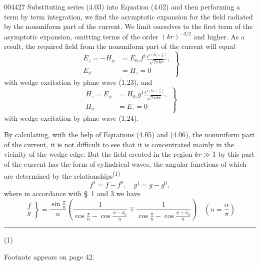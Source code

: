 \begin{scanpage}{0044}{27}
Substituting series (4.03) into Equation (4.02) and then performing a term by term integration, we find the asymptotic expansion for the field radiated by the nonuniform part of the current. We limit ourselves to the first term of the asymptotic expansion, omitting terms of the order $(kr)^{-3/2}$ and higher. As a result, the required field from the nonuniform part of the current will equal
\[\left.\begin{aligned}E_z=-H_\phi&=E_{0z}f^1\frac{e^{i(kr+\frac\pi4)}}{\sqrt{2\pi kr}},\\E_\phi&=H_z=0\end{aligned}\right\}\tag{4.05}\]
with wedge excitation by plane wave (1.23), and
\[\left.\begin{aligned}H_z=E_\phi&=H_{0z}g^1\frac{e^{i(kr+\frac\pi4)}}{\sqrt{2\pi kr}},\\H_\phi&=E_z=0\end{aligned}\right\}\tag{4.06}\]
with wedge excitation by plane wave (1.24).

By calculating, with the help of Equations (4.05) and (4.06), the nonuniform part of the current, it is not difficult to see that it is concentrated mainly in the vicinity of the wedge edge. But the field created in the region $kr\gg1$ by this part of the current has the form of cylindrical waves, the angular functions of which are determined by the relationships\textsuperscript{(1)}
\[f^1=f-f^0,\quad g^1=g-g^0,\tag{4.07}\]
where in accordance with \S\ 1 and 3 we have
\[\left.\begin{matrix}f\\g\end{matrix}\right\}=\frac{\sin\frac\pi n}{n}\left(\frac1{\cos\frac\pi n-\cos\frac{\phi-\phi_0}{n}}\mp\frac1{\cos\frac\pi n-\cos\frac{\phi+\phi_0}{n}}\right)\quad\left(n=\frac\alpha\pi\right)\tag{4.08}\]
\par\smallskip\hrule\smallskip
\noindent (1)\par Footnote appears on page 42.
\end{scanpage}
